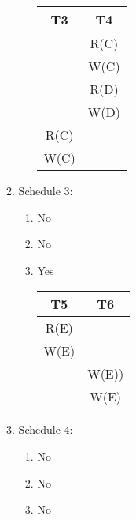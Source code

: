 \documentclass{report}
\begin{document}
\begin{enumerate}
\begin{enumerate}
\begin{enumerate}
\begin{tabular}{c c}
				T3 & T4 \\
				\hline 
				& R(C) \\
				& W(C) \\
				& R(D) \\ 
				& W(D)\\ 
				R(C) & \\ 
				W(C) & \\
				\end{tabular}
			\end{enumerate}
			\item Schedule 3:
			\begin{enumerate}
				\item No
				\item No
				\item Yes \\
				\begin{tabular}{c c} \\
				T5 & T6 \\
				\hline 
				R(E)& \\
				W(E)& \\ 
				& W(E)) \\
				& W(E)\\
				\end{tabular}
			\end{enumerate}
			\item Schedule 4:
			\begin{enumerate}
				\item No
				\item No
				\item No
			\end{enumerate}
		\end{enumerate}
	\end{enumerate}
\end{document}
